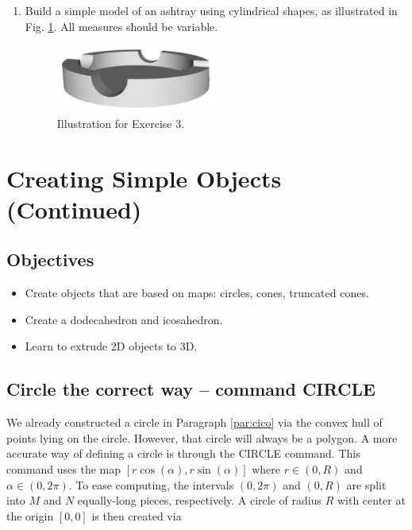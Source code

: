 \documentclass{article}
\begin{document}
\begin{enumerate}
\item Build a simple model of an ashtray using cylindrical shapes, 
as illustrated in Fig. \ref{fig:ashtray}.
All measures should be variable.

\begin{figure}[!ht]
\begin{center}
\includegraphics[width=0.5\textwidth]{img/ashtray.png}
\end{center}
\vspace{-2mm}
\caption{Illustration for Exercise 3.}
\label{fig:ashtray}
\end{figure}
\noindent

\end{enumerate}

\section{Creating Simple Objects (Continued)} \label{sec:cso2}

\subsection{Objectives}
\begin{itemize}
\item Create objects that are based on maps: circles, cones, truncated cones.
\item Create a dodecahedron and icosahedron.
\item Learn to extrude 2D objects to 3D.
\end{itemize}

\subsection{Circle the correct way -- command CIRCLE}

We already constructed a circle in Paragraph \ref{par:cico} via the convex 
hull of points lying on the circle. However, that circle will always be 
a polygon. A more accurate way of defining a circle is through the 
CIRCLE command. This command uses the map $[r \cos(\alpha), r \sin(\alpha)]$
where $r \in (0, R)$ and $\alpha \in (0, 2\pi)$. To ease computing, the 
intervals $(0, 2\pi)$ and $(0, R)$ are split into $M$ and $N$ equally-long 
pieces, respectively. A circle of radius $R$ with center at the origin $[0, 0]$
is then created via 
\end{document}
